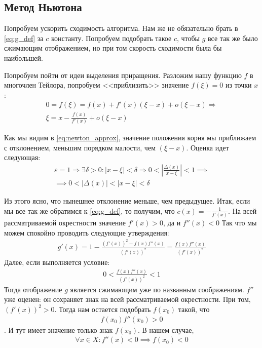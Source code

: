 \subsection{Метод Ньютона}
Попробуем ускорить сходимость алгоритма. Нам же не обязательно брать в \cref{eq:g_def} за \(c\) константу. Попробуем подобрать такое \(c\), чтобы \(g\) все так же было сжимающим отображением, но при том скорость сходимости была бы наибольшей. 

Попробуем пойти от идеи выделения приращения. Разложим нашу функцию \(f\) в многочлен Тейлора, попробуем <<приблизить>> значение \(f(\xi) = 0\) из точки \(x\):
\begin{align}
  0 = f(\xi) = f(x) + f'(x)(\xi - x) + o(\xi - x) \Rightarrow \\
  \xi = x -\frac{f(x)}{f'(x)} + o(\xi - x) \label{eq:newton_approx}
\end{align}

Как мы видим в \cref{eq:newton_approx}, значение положения корня мы приближаем с отклонением, меньшим порядком малости, чем \((\xi - x)\). Оценка идет следующая:
\begin{align}
  \varepsilon = 1 \Longrightarrow \exists \delta > 0 \colon |x - \xi| < \delta \Rightarrow 0 < \left|\frac{\Delta(x)}{x - \xi}\right| < 1 \implies \\
  \implies 0 < |\Delta(x)| < |x - \xi| < \delta
\end{align}

Из этого ясно, что нынешнее отклонение меньше, чем предыдущее.
Итак, если мы все так же обратимся к \cref{eq:g_def}, то получим, что \(c(x) = -\frac{1}{f'(x)}\). На всей рассматриваемой окрестности значение \(f'(x) > 0\), да и \(f''(x) < 0 \) Так что мы можем спокойно проводить следующие утверждения:
\begin{align}
  g'(x) = 1 - \frac{(f'(x))^2 - f(x)f''(x)}{(f'(x))^2} = \frac{f(x)f''(x)}{(f'(x))^2}
\end{align}
Далее, если выполняется условие:
\begin{align}
  0 < \frac{f(x)f''(x)}{(f'(x))^2} < 1
\end{align}
Тогда отображение \(g\) является сжимающим уже по названным соображениям. \(f''\) уже оценен: он сохраняет знак на всей рассматриваемой окрестности. При том, \((f'(x))^2 > 0\). Тогда нам остается подобрать \(f(x_0)\) такой, что
\begin{align}\label{eq:f_ddf_cond}
  f(x_0) f''(x_0) > 0
\end{align}
. И тут имеет значение только знак \(f(x_0)\). В нашем случае,
\begin{align*}
  \forall x \in X \colon f''(x) < 0 \implies f(x_0) < 0
\end{align*}


